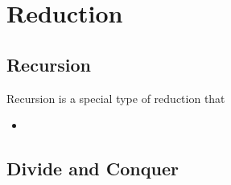 \chapter{Reduction}

\section{Recursion}

  Recursion is a special type of reduction that

  \begin{itemize}
    \item
  \end{itemize}

\section{Divide and Conquer}
